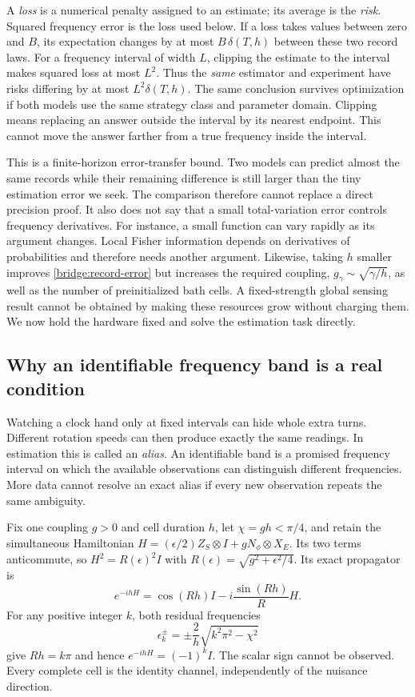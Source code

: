 \documentclass[11pt,a4paper]{article}
\numberwithin{equation}{section}
\theoremstyle{remark}
\begin{document}
A \emph{loss} is a numerical penalty assigned to an estimate; its average
is the \emph{risk}. Squared frequency error is the loss used below.
If a loss takes values between zero and $B$, its expectation changes by
at most $B\,\delta(T,h)$ between these two record laws. For a frequency
interval of width $L$, clipping the estimate to the interval makes squared
loss at most $L^2$. Thus the \emph{same} estimator and experiment have
risks differing by at most $L^2\delta(T,h)$. The same conclusion survives
optimization if both models use the same strategy class and parameter domain.
Clipping means replacing an answer outside the interval by its nearest
endpoint. This cannot move the answer farther from a true frequency
inside the interval.

This is a finite-horizon error-transfer bound. Two models can predict
almost the same records while their remaining difference is still larger
than the tiny estimation error we seek. The comparison therefore cannot
replace a direct precision proof. It also does not say that a
small total-variation error controls frequency derivatives. For instance,
a small function can vary rapidly as its argument changes. Local Fisher
information depends on derivatives of probabilities and therefore needs
another argument. Likewise, taking $h$ smaller improves
\eqref{bridge:record-error} but increases the required coupling,
$g_\gamma\sim\sqrt{\gamma/h}$, as well as the number of preinitialized bath
cells. A fixed-strength global sensing result cannot be obtained by making
these resources grow without charging them. We now hold the hardware fixed
and solve the estimation task directly.

\subsection{Why an identifiable frequency band is a real condition}

Watching a clock hand only at fixed intervals can hide whole extra turns.
Different rotation speeds can then produce exactly the same readings.
In estimation this is called an \emph{alias}. An identifiable band is a
promised frequency interval on which the available observations can
distinguish different frequencies. More data cannot resolve an exact alias
if every new observation repeats the same ambiguity.

Fix one coupling $g>0$ and cell duration $h$, let $\chi=gh<\pi/4$, and
retain the simultaneous Hamiltonian
$H=(\epsilon/2)Z_S\otimes I+gN_\phi\otimes X_E$.
Its two terms anticommute, so
$H^2=R(\epsilon)^2I$ with
$R(\epsilon)=\sqrt{g^2+\epsilon^2/4}$. Its exact propagator is
\begin{equation}
 e^{-ihH}=\cos(Rh)I-i\frac{\sin(Rh)}R H.
\end{equation}
For any positive integer $k$, both residual frequencies
\begin{equation}
 \epsilon_k^\pm=\pm\frac2h\sqrt{k^2\pi^2-\chi^2}
\end{equation}
give $Rh=k\pi$ and hence $e^{-ihH}=(-1)^k I$. The scalar sign cannot be
observed. Every complete cell is the identity channel, independently of
the nuisance direction.
\end{document}
